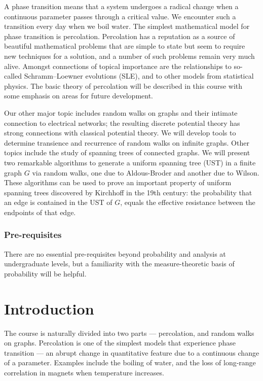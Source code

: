 \documentclass[a4paper]{article}
\begin{document}
\maketitle
{\small
\setlength{\parindent}{0em}
\setlength{\parskip}{1em}

A phase transition means that a system undergoes a radical change when a continuous parameter passes through a critical value. We encounter such a transition every day when we boil water. The simplest mathematical model for phase transition is percolation. Percolation has a reputation as a source of beautiful mathematical problems that are simple to state but seem to require new techniques for a solution, and a number of such problems remain very much alive. Amongst connections of topical importance are the relationships to so-called Schramm--Loewner evolutions (SLE), and to other models from statistical physics. The basic theory of percolation will be described in this course with some emphasis on areas for future development.

Our other major topic includes random walks on graphs and their intimate connection to electrical networks; the resulting discrete potential theory has strong connections with classical potential theory. We will develop tools to determine transience and recurrence of random walks on infinite graphs. Other topics include the study of spanning trees of connected graphs. We will present two remarkable algorithms to generate a uniform spanning tree (UST) in a finite graph $G$ via random walks, one due to Aldous-Broder and another due to Wilson. These algorithms can be used to prove an important property of uniform spanning trees discovered by Kirchhoff in the 19th century: the probability that an edge is contained in the UST of $G$, equals the effective resistance between the endpoints of that edge.

\subsubsection*{Pre-requisites}
There are no essential pre-requisites beyond probability and analysis at undergraduate levels, but a familiarity with the measure-theoretic basis of probability will be helpful.
}
\tableofcontents

\setcounter{section}{-1}
\section{Introduction}
The course is naturally divided into two parts --- percolation, and random walks on graphs. Percolation is one of the simplest models that experience phase transition --- an abrupt change in quantitative feature due to a continuous change of a parameter. Examples include the boiling of water, and the loss of long-range correlation in magnets when temperature increases.
\end{document}
